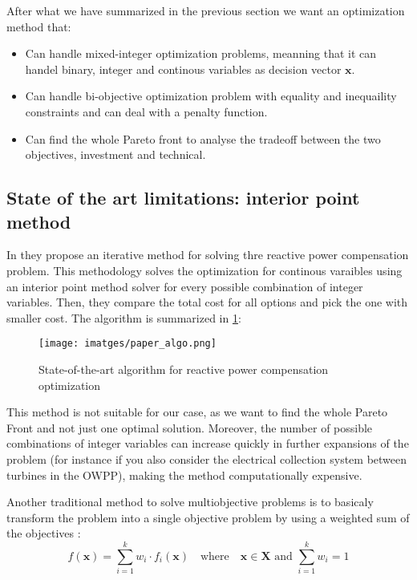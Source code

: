 \documentclass[a4paper,11pt, titlepage, twoside]{article}
\begin{document}
After what we have summarized in the previous section we want an optimization method that:
\begin{itemize}
    \item Can handle mixed-integer optimization problems, meanning that it can handel binary, integer and continous variables as decision vector $\mathbf{x}$.
    \item Can handle bi-objective optimization problem with equality and inequaility constraints and can deal with a penalty function.
    \item Can find the whole Pareto front to analyse the tradeoff between the two objectives, investment and technical.
\end{itemize}

\subsection{State of the art limitations: interior point method}

In \cite{paperbase} they propose an iterative method for solving thre reactive power compensation problem. This methodology solves the optimization
for continous varaibles using an interior point method solver \cite{ipm} for every possible combination of integer variables. Then, they compare the total
cost for all options and pick the one with smaller cost. The algorithm is summarized in \ref{fig:paaperalgo}:

\begin{figure}[H]
    \centering
    \texttt{[image: imatges/paper\_algo.png]}
    \caption{State-of-the-art algorithm for reactive power compensation optimization \cite{paperbase}}
    \label{fig:paaperalgo}
\end{figure}
    


This method is not suitable for our case, as we want to find the whole Pareto Front and not just one optimal solution. Moreover, the number of possible combinations of integer variables
can increase quickly in further expansions of the problem (for instance if you also consider the electrical collection system between turbines in the OWPP), making the method computationally expensive.

Another traditional method to solve multiobjective problems is to basicaly transform the problem into a single objective problem by using a weighted sum of the objectives \cite{nsgai}:
\begin{equation}\label{weightedsum}
    f(\mathbf{x}) = \sum_{i=1}^{k} w_i \cdot f_i(\mathbf{x}) \quad \text{where} \quad \mathbf{x} \in \mathbf{X} \text{ and } \sum_{i=1}^{k} w_i = 1
\end{equation}
\end{document}
